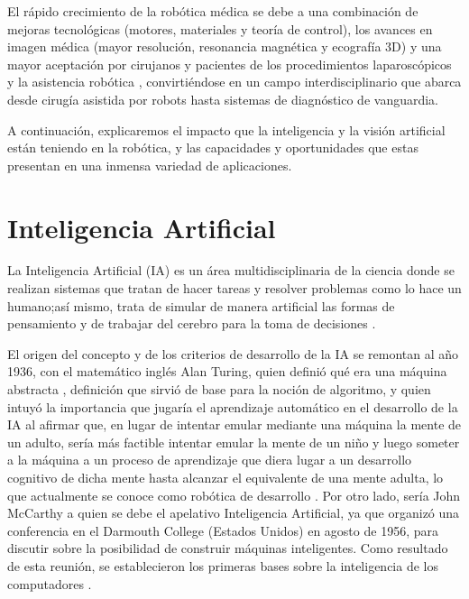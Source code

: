 El rápido crecimiento de la robótica médica se debe a una combinación de mejoras tecnológicas (motores, materiales y teoría de control), los avances en imagen médica (mayor resolución, resonancia magnética y ecografía 3D) y una mayor aceptación por cirujanos y pacientes de los procedimientos laparoscópicos y la asistencia robótica \cite{Beasley12}, convirtiéndose en un campo interdisciplinario que abarca desde cirugía asistida por robots hasta sistemas de diagnóstico de vanguardia. %

A continuación, explicaremos el impacto que la inteligencia y la visión artificial están teniendo en la robótica, y las capacidades y oportunidades que estas presentan en una inmensa variedad de aplicaciones.
\pagebreak

\section{Inteligencia Artificial}
\label{sec:IA} 

La Inteligencia Artificial (IA) es un área multidisciplinaria de la ciencia %
donde se realizan sistemas que tratan de hacer tareas y resolver problemas como lo hace un humano;así mismo, trata de simular de manera artificial las formas de pensamiento y de trabajar del cerebro para la toma de decisiones \cite{Ponce14}.

El origen del concepto y de los criterios de desarrollo de la IA se remontan al año 1936, con el matemático inglés Alan Turing, quien definió qué era una máquina abstracta \cite{Hardy01}, %
definición que sirvió de base para la noción de algoritmo, %
y quien intuyó la importancia que jugaría el aprendizaje automático en el desarrollo de la IA al afirmar que, en lugar de intentar emular mediante una máquina la mente de un adulto, sería más factible intentar emular la mente de un niño y luego someter a la máquina a un proceso de aprendizaje que diera lugar a un desarrollo cognitivo de dicha mente hasta alcanzar el equivalente de una mente adulta, lo que actualmente se conoce como robótica de desarrollo \cite{Gonzalez17}. Por otro lado, sería John McCarthy a quien se debe el apelativo Inteligencia Artificial, ya que organizó una conferencia en el Darmouth College (Estados Unidos) en agosto de 1956, para discutir sobre la posibilidad de construir máquinas inteligentes. Como resultado de esta reunión, se establecieron los primeras bases sobre la inteligencia de los computadores \cite{Ponce14}.

